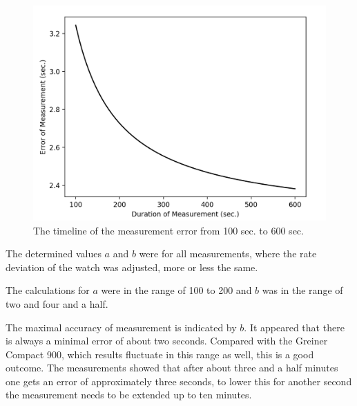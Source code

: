 \documentclass[12pt, a4paper]{report}
\begin{document}
      \begin{figure}[H]
        \centering
        \includegraphics[scale=0.6]{Images/error_measurement_100_600}
        
        \caption{The timeline of the measurement error from 100 sec. to 600 sec.}
        \end{figure}

The determined values $a$ and $b$ were for all measurements, where the rate deviation of the watch was adjusted, more or less the same.

The calculations for $a$ were in the range of 100 to 200 and $b$ was in the range of two and four and a half. 


The maximal accuracy of measurement is indicated by $b$. It appeared that there is always a minimal error of about two seconds. Compared with the Greiner Compact 900, which results fluctuate in this range as well, this is a good outcome. 
The measurements showed that after about three and a half minutes one gets an error of approximately three seconds, to lower this for another second the measurement needs to be extended up to ten minutes.     
    
\end{document}
